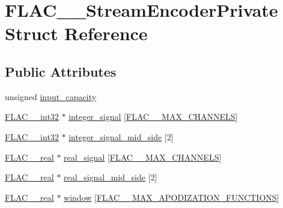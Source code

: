 \hypertarget{struct_f_l_a_c_____stream_encoder_private}{}\section{F\+L\+A\+C\+\_\+\+\_\+\+Stream\+Encoder\+Private Struct Reference}
\label{struct_f_l_a_c_____stream_encoder_private}
\subsection*{Public Attributes}
\begin{DoxyCompactItemize}
\item 
unsigned \hyperlink{struct_f_l_a_c_____stream_encoder_private_a4ba9a381341354ab7661ddaaa472ee95}{input\+\_\+capacity}
\item 
\hyperlink{ordinals_8h_a33fd77bfe6d685541a0c034a75deccdc}{F\+L\+A\+C\+\_\+\+\_\+int32} $\ast$ \hyperlink{struct_f_l_a_c_____stream_encoder_private_a2fd6ac71c302942508089c914e4a107b}{integer\+\_\+signal} \mbox{[}\hyperlink{group__flac__format_ga488aa5678a58d08f984f5d39185b763d}{F\+L\+A\+C\+\_\+\+\_\+\+M\+A\+X\+\_\+\+C\+H\+A\+N\+N\+E\+LS}\mbox{]}
\item 
\hyperlink{ordinals_8h_a33fd77bfe6d685541a0c034a75deccdc}{F\+L\+A\+C\+\_\+\+\_\+int32} $\ast$ \hyperlink{struct_f_l_a_c_____stream_encoder_private_a6779d1acb8518f498d8fe350c38e4d9b}{integer\+\_\+signal\+\_\+mid\+\_\+side} \mbox{[}2\mbox{]}
\item 
\hyperlink{float_8h_a72409a67c78d2af7d29a9e9362cd49b8}{F\+L\+A\+C\+\_\+\+\_\+real} $\ast$ \hyperlink{struct_f_l_a_c_____stream_encoder_private_a1b893a8b991fc542b3740906af5a63a3}{real\+\_\+signal} \mbox{[}\hyperlink{group__flac__format_ga488aa5678a58d08f984f5d39185b763d}{F\+L\+A\+C\+\_\+\+\_\+\+M\+A\+X\+\_\+\+C\+H\+A\+N\+N\+E\+LS}\mbox{]}
\item 
\hyperlink{float_8h_a72409a67c78d2af7d29a9e9362cd49b8}{F\+L\+A\+C\+\_\+\+\_\+real} $\ast$ \hyperlink{struct_f_l_a_c_____stream_encoder_private_a18de1a86d5904d19b44770caf4c63040}{real\+\_\+signal\+\_\+mid\+\_\+side} \mbox{[}2\mbox{]}
\item 
\hyperlink{float_8h_a72409a67c78d2af7d29a9e9362cd49b8}{F\+L\+A\+C\+\_\+\+\_\+real} $\ast$ \hyperlink{struct_f_l_a_c_____stream_encoder_private_a2ad0c9a1fb526cb8f7347284b89398f5}{window} \mbox{[}\hyperlink{src_2lib_f_l_a_c_2include_2protected_2stream__encoder_8h_ad9a5c4c2d9c054daf37639087480ad17}{F\+L\+A\+C\+\_\+\+\_\+\+M\+A\+X\+\_\+\+A\+P\+O\+D\+I\+Z\+A\+T\+I\+O\+N\+\_\+\+F\+U\+N\+C\+T\+I\+O\+NS}\mbox{]}

\end{DoxyCompactItemize}
